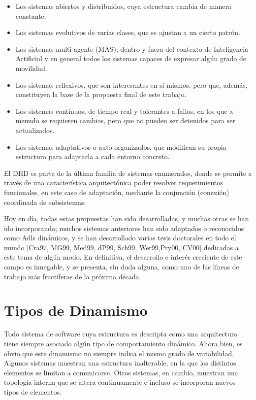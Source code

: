 \begin{itemize}
 \item Los sistemas abiertos y distribuidos, cuya estructura cambia de manera
constante.

\item Los sistemas evolutivos de varias clases, que se ajustan a un cierto
patrón.

\item Los sistemas multi-agente (MAS), dentro y fuera del contexto
de Inteligencia Artificial y en general todos los sistemas capaces de expresar 
algún grado de movilidad.

\item Los sistemas reflexivos, que son interesantes en sí
mismos, pero que, además, constituyen la base de la propuesta final de este
trabajo.

\item Los sistemas continuos, de tiempo real y tolerantes a fallos, en los que
a menudo se requieren cambios, pero que no pueden ser detenidos para ser
actualizados.

\item Los sistemas adaptativos o auto-organizados, que modifican su propia
estructura para adaptarla a cada entorno concreto.

\end{itemize}


El DHD es parte de la última familia de sistemas enumerados, donde se permite
a través de una característica arquitectónica poder resolver requerimientos
funcionales, en este caso de adaptación, mediante la conjunción (conexión)
coordinada de subsistemas.


Hoy en día, todas estas propuestas han sido desarrolladas, y muchas otras se
han ido incorporando; muchos sistemas anteriores han sido adaptados o
reconocidos como Adls dinámicos, y se han desarrollado varias tesis doctorales
en todo el mundo [Cra97, MG99, Med99, dP99, Sch99, Wer99,Pry00, CV00] dedicadas
a este tema de algún modo. En definitiva, el desarrollo e interés creciente
de este campo es innegable, y se presenta, sin duda alguna, como uno de las
líneas de trabajo más fructíferas de la próxima década.


\section{Tipos de Dinamismo} \label{sec:tipos_dinamismos}

Todo sistema de software cuya estructura es descripta como una arquitectura tiene
siempre asociado algún tipo de comportamiento dinámico. Ahora bien, es
obvio que este dinamismo no siempre indica el mismo grado de variabilidad.
Algunos sistemas muestran una estructura inalterable, en la que los distintos
elementos se limitan a comunicarse. Otros sistemas, en cambio, muestran una topología interna que se altera continuamente e incluso se incorporan nuevos tipos de elementos.

